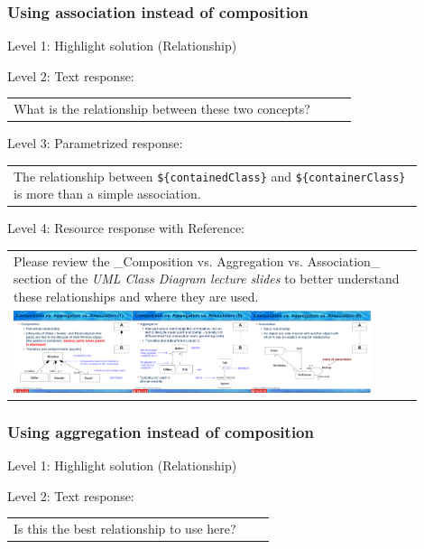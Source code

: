 \subsubsection{Using association instead of composition}

\noindent Level 1: Highlight solution (Relationship) \medskip

\noindent Level 2: Text response: \medskip

\begin{tabular}{|p{0.9\linewidth}}
What is the relationship between these two concepts?
\end{tabular} \medskip

\noindent Level 3: Parametrized response: \medskip

\begin{tabular}{|p{0.9\linewidth}}
The relationship between \verb|${containedClass}| and \verb|${containerClass}| is more than a simple association.
\end{tabular} \medskip

\noindent Level 4: Resource response with Reference: \medskip

\begin{tabular}{|p{0.9\linewidth}}
Please review the _Composition vs. Aggregation vs. Association_ section of 
the \textit{UML Class Diagram lecture slides} to 
better understand these relationships and where they are used.

\\
\includegraphics[width=0.9\textwidth]{images/composition_aggregation_association.png}
\end{tabular} \medskip


\subsubsection{Using aggregation instead of composition}

\noindent Level 1: Highlight solution (Relationship) \medskip

\noindent Level 2: Text response: \medskip

\begin{tabular}{|p{0.9\linewidth}}
Is this the best relationship to use here?
\end{tabular} \medskip

